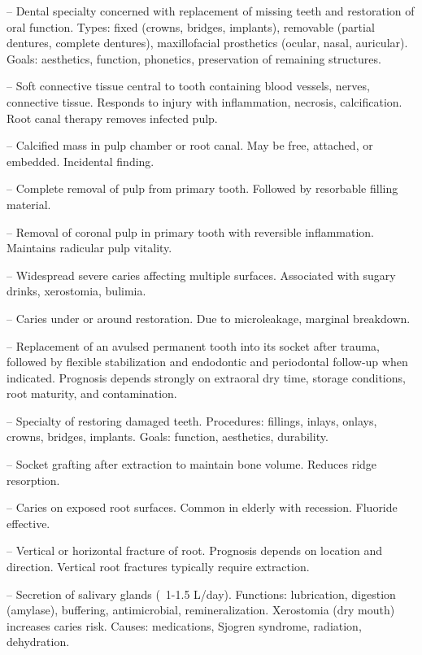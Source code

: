 -- Dental specialty concerned with replacement of missing teeth and restoration of oral function. Types: fixed (crowns, bridges, implants), removable (partial dentures, complete dentures), maxillofacial prosthetics (ocular, nasal, auricular). Goals: aesthetics, function, phonetics, preservation of remaining structures.

-- Soft connective tissue central to tooth containing blood vessels, nerves, connective tissue. Responds to injury with inflammation, necrosis, calcification. Root canal therapy removes infected pulp.

-- Calcified mass in pulp chamber or root canal. May be free, attached, or embedded. Incidental finding.

-- Complete removal of pulp from primary tooth. Followed by resorbable filling material.

-- Removal of coronal pulp in primary tooth with reversible inflammation. Maintains radicular pulp vitality.

-- Widespread severe caries affecting multiple surfaces. Associated with sugary drinks, xerostomia, bulimia.

-- Caries under or around restoration. Due to microleakage, marginal breakdown.

-- Replacement of an avulsed permanent tooth into its socket after trauma, followed by flexible stabilization and endodontic and periodontal follow-up when indicated. Prognosis depends strongly on extraoral dry time, storage conditions, root maturity, and contamination.

-- Specialty of restoring damaged teeth. Procedures: fillings, inlays, onlays, crowns, bridges, implants. Goals: function, aesthetics, durability.

-- Socket grafting after extraction to maintain bone volume. Reduces ridge resorption.

-- Caries on exposed root surfaces. Common in elderly with recession. Fluoride effective.

-- Vertical or horizontal fracture of root. Prognosis depends on location and direction. Vertical root fractures typically require extraction.

-- Secretion of salivary glands (~1-1.5 L/day). Functions: lubrication, digestion (amylase), buffering, antimicrobial, remineralization. Xerostomia (dry mouth) increases caries risk. Causes: medications, Sjogren syndrome, radiation, dehydration.

